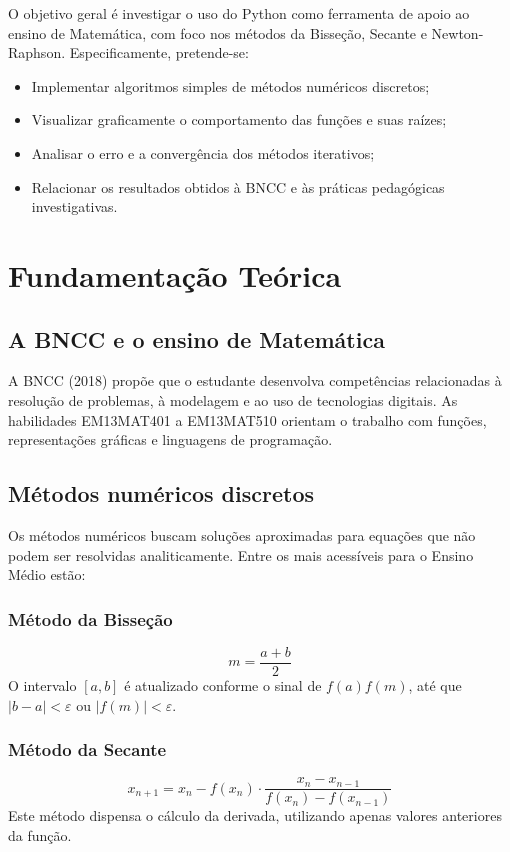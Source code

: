 \documentclass[12pt,a4paper]{report}
\begin{document}
	O objetivo geral é investigar o uso do Python como ferramenta de apoio ao ensino de Matemática, com foco nos métodos da Bisseção, Secante e Newton-Raphson. Especificamente, pretende-se:
	\begin{itemize}
		\item Implementar algoritmos simples de métodos numéricos discretos;
		\item Visualizar graficamente o comportamento das funções e suas raízes;
		\item Analisar o erro e a convergência dos métodos iterativos;
		\item Relacionar os resultados obtidos à BNCC e às práticas pedagógicas investigativas.
	\end{itemize}
	
	\newpage
	\chapter{Fundamentação Teórica}
	
	\section{A BNCC e o ensino de Matemática}
	A BNCC (2018) propõe que o estudante desenvolva competências relacionadas à resolução de problemas, à modelagem e ao uso de tecnologias digitais. As habilidades EM13MAT401 a EM13MAT510 orientam o trabalho com funções, representações gráficas e linguagens de programação.
	
	\section{Métodos numéricos discretos}
	Os métodos numéricos buscam soluções aproximadas para equações que não podem ser resolvidas analiticamente. Entre os mais acessíveis para o Ensino Médio estão:
	
	\subsection{Método da Bisseção}
	\begin{equation}
		m = \frac{a + b}{2}
	\end{equation}
	O intervalo $[a,b]$ é atualizado conforme o sinal de $f(a)f(m)$, até que $|b-a| < \varepsilon$ ou $|f(m)| < \varepsilon$.
	
	\subsection{Método da Secante}
	\begin{equation}
		x_{n+1} = x_n - f(x_n) \cdot \frac{x_n - x_{n-1}}{f(x_n) - f(x_{n-1})}
	\end{equation}
	Este método dispensa o cálculo da derivada, utilizando apenas valores anteriores da função.
	
\end{document}
